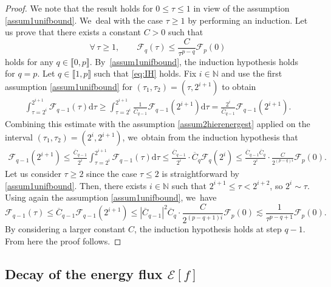 \documentclass[10pt]{amsart}
\theoremstyle{plain}
\theoremstyle{definition}
\newcommand\dr{{\mathrm{d}}}
\begin{document}
\begin{proof}
We note that the result holds for $0 \leq \tau \leq 1$ in view of the assumption \ref{assum1unifbound}. We~deal with the case $\tau \geq 1$ by performing an induction. Let us prove that there exists a constant $C>0$ such that
\begin{equation}\label{eq:IH}
\forall \, \tau \geq 1, \qquad \mathcal{F}_q(\tau) \leq \frac{C}{\tau^{p-q}} \mathcal{F}_p(0) \tag{IH-q}
\end{equation}
holds for any $q \in \llbracket 0,p \rrbracket$. By~\ref{assum1unifbound}, the induction hypothesis holds for $q=p$. Let $q \in \llbracket 1,p \rrbracket$ such that \eqref{eq:IH} holds. Fix $i \in \mathbb{N}$ and use the first assumption \ref{assum1unifbound} for $(\tau_1,\tau_2)=(\tau,2^{i+1})$ to obtain
\begin{align*}
\int_{ \tau= 2^i}^{2^{i+1}} \mathcal{F}_{q-1}(\tau) \dr \tau \geq \int_{\tau = 2^i}^{2^{i+1}} \frac{1}{\overline{C}_{q-1}} \mathcal{F}_{q-1} (2^{i+1})\dr \tau =\frac{2^i}{\overline{C}_{q-1}} \mathcal{F}_{q-1} (2^{i+1}).
\end{align*}
Combining this estimate with the assumption \ref{assum2hierenergest} applied on the interval $(\tau_1,\tau_2)=(2^i,2^{i+1})$, we~obtain from the induction hypothesis that
\begin{align*}
\mathcal{F}_{q-1} (2^{i+1}) \leq \frac{\overline{C}_{q-1}}{2^i} \int_{ \tau=2^i}^{2^{i+1}} \mathcal{F}_{q-1}(\tau) \dr \tau \leq \frac{\overline{C}_{q-1}}{2^i} \cdot \overline{C}_q \mathcal{F}_q(2^i) \leq \frac{\overline{C}_{q-1}\overline{C}_q}{2^i} \cdot \frac{C}{2^{(p-q)i}} \mathcal{F}_p(0).
\end{align*}
Let us consider $\tau \geq 2$ since the case $\tau \leq 2$ is straightforward by \ref{assum1unifbound}. Then, there exists $i \in \mathbb{N}$ such that $2^{i+1} \leq \tau < 2^{i+2}$, so $2^i \sim \tau$. Using again the assumption \ref{assum1unifbound}, we~have
\[
\mathcal{F}_{q-1} (\tau) \leq \overline{C}_{q-1}\mathcal{F}_{q-1} (2^{i+1}) \leq |\overline{C}_{q-1}|^2\overline{C}_q \cdot \frac{C}{2^{(p-q+1)i}} \mathcal{F}_p(0) \lesssim \frac{1}{\tau^{p-q+1}} \mathcal{F}_p(0).
\]
By considering a larger constant $C$, the induction hypothesis holds at step $q-1$. From here the proof follows.
\end{proof}

\subsection{Decay of the energy flux $\mathcal{E}[f]$}\label{subsect_decay_fluxes}
\end{document}
